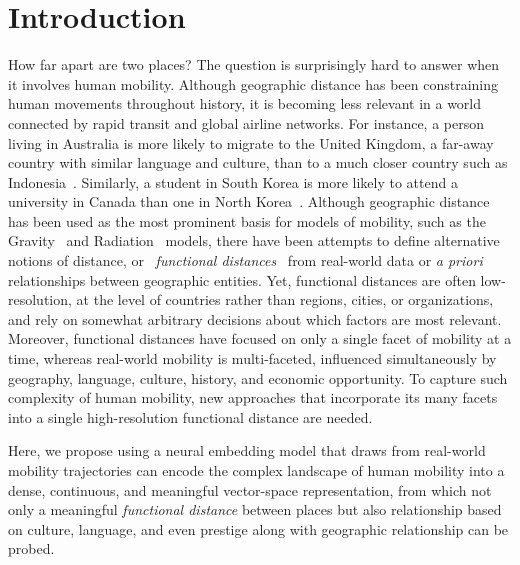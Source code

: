 \documentclass[12pt]{article} %
\begin{document}
%
%
\section{Introduction}\label{sec:introduction} %


How far apart are two places?
The question is surprisingly hard to answer when it involves human mobility.
Although geographic distance has been constraining  human movements throughout history, it is becoming less relevant in a world connected by rapid transit and global airline networks.
For instance, a person living in Australia is more likely to migrate to the United Kingdom, a far-away country with similar language and culture, than to a much closer country such as Indonesia~\autocite{pew2018migration}.
Similarly, a student in South Korea is more likely to attend a university in Canada than one in North Korea~\autocite{unesco2019students}.
Although geographic distance has been used as the most prominent basis for models of mobility, such as the Gravity~\autocite{zipf1946gravity} and Radiation~\autocite{simini2012universal} models, there have been attempts to define alternative notions of distance, or ~\textit{functional distances}~\autocite{boschma2005proximity, brown1970functional, brown1970migration, kim2018functional} from real-world data or \textit{a priori} relationships between geographic entities.
Yet, functional distances are often low-resolution, at the level of countries rather than regions, cities, or organizations, and rely on somewhat arbitrary decisions about which factors are most relevant.
Moreover, functional distances have focused on only a single facet of mobility at a time, whereas real-world mobility is multi-faceted, influenced simultaneously by geography, language, culture, history, and economic opportunity.
To capture such complexity of human mobility, new approaches that incorporate its many facets into a single high-resolution functional distance are needed.

			
Here, we propose using a neural embedding model that draws from real-world mobility trajectories can encode the complex landscape of human mobility into a dense, continuous, and meaningful vector-space representation, from which not only a meaningful \textit{functional distance} between places but also relationship based on culture, language, and even prestige along with geographic relationship can be probed.
\end{document}
